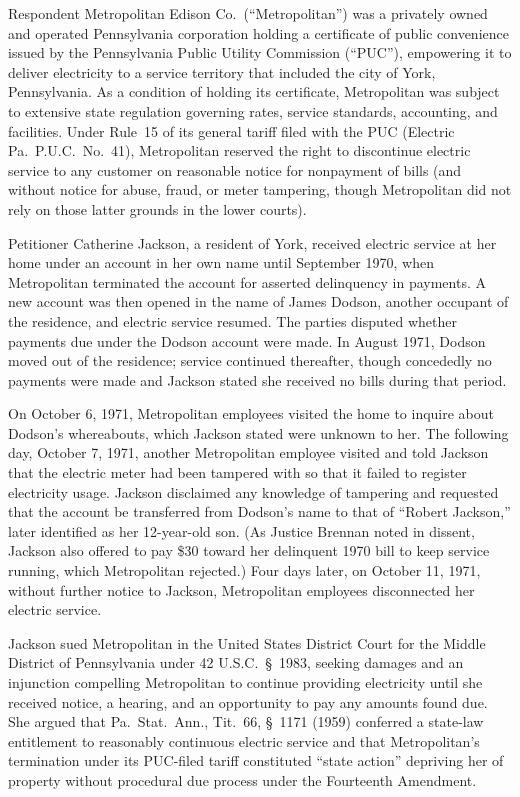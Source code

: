 \documentclass[12pt]{article}
\begin{document}
Respondent Metropolitan Edison Co.\ (``Metropolitan'') was a privately owned and operated Pennsylvania corporation holding a certificate of public convenience issued by the Pennsylvania Public Utility Commission (``PUC''), empowering it to deliver electricity to a service territory that included the city of York, Pennsylvania. As a condition of holding its certificate, Metropolitan was subject to extensive state regulation governing rates, service standards, accounting, and facilities. Under Rule~15 of its general tariff filed with the PUC (Electric Pa.\ P.U.C.\ No.~41), Metropolitan reserved the right to discontinue electric service to any customer on reasonable notice for nonpayment of bills (and without notice for abuse, fraud, or meter tampering, though Metropolitan did not rely on those latter grounds in the lower courts).

Petitioner Catherine Jackson, a resident of York, received electric service at her home under an account in her own name until September 1970, when Metropolitan terminated the account for asserted delinquency in payments. A new account was then opened in the name of James Dodson, another occupant of the residence, and electric service resumed. The parties disputed whether payments due under the Dodson account were made. In August 1971, Dodson moved out of the residence; service continued thereafter, though concededly no payments were made and Jackson stated she received no bills during that period.

On October 6, 1971, Metropolitan employees visited the home to inquire about Dodson's whereabouts, which Jackson stated were unknown to her. The following day, October 7, 1971, another Metropolitan employee visited and told Jackson that the electric meter had been tampered with so that it failed to register electricity usage. Jackson disclaimed any knowledge of tampering and requested that the account be transferred from Dodson's name to that of ``Robert Jackson,'' later identified as her 12-year-old son. (As Justice Brennan noted in dissent, Jackson also offered to pay \$30 toward her delinquent 1970 bill to keep service running, which Metropolitan rejected.) Four days later, on October 11, 1971, without further notice to Jackson, Metropolitan employees disconnected her electric service.

Jackson sued Metropolitan in the United States District Court for the Middle District of Pennsylvania under 42 U.S.C.\ \S~1983, seeking damages and an injunction compelling Metropolitan to continue providing electricity until she received notice, a hearing, and an opportunity to pay any amounts found due. She argued that Pa.\ Stat.\ Ann., Tit.~66, \S~1171 (1959) conferred a state-law entitlement to reasonably continuous electric service and that Metropolitan's termination under its PUC-filed tariff constituted ``state action'' depriving her of property without procedural due process under the Fourteenth Amendment.
\end{document}
